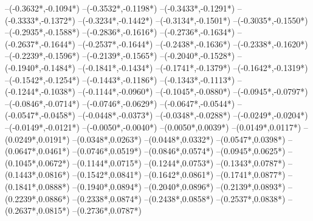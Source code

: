{	--({-0.3632*\xskala},{-0.1094*\yskala})
	--({-0.3532*\xskala},{-0.1198*\yskala})
	--({-0.3433*\xskala},{-0.1291*\yskala})
	--({-0.3333*\xskala},{-0.1372*\yskala})
	--({-0.3234*\xskala},{-0.1442*\yskala})
	--({-0.3134*\xskala},{-0.1501*\yskala})
	--({-0.3035*\xskala},{-0.1550*\yskala})
	--({-0.2935*\xskala},{-0.1588*\yskala})
	--({-0.2836*\xskala},{-0.1616*\yskala})
	--({-0.2736*\xskala},{-0.1634*\yskala})
	--({-0.2637*\xskala},{-0.1644*\yskala})
	--({-0.2537*\xskala},{-0.1644*\yskala})
	--({-0.2438*\xskala},{-0.1636*\yskala})
	--({-0.2338*\xskala},{-0.1620*\yskala})
	--({-0.2239*\xskala},{-0.1596*\yskala})
	--({-0.2139*\xskala},{-0.1565*\yskala})
	--({-0.2040*\xskala},{-0.1528*\yskala})
	--({-0.1940*\xskala},{-0.1484*\yskala})
	--({-0.1841*\xskala},{-0.1434*\yskala})
	--({-0.1741*\xskala},{-0.1379*\yskala})
	--({-0.1642*\xskala},{-0.1319*\yskala})
	--({-0.1542*\xskala},{-0.1254*\yskala})
	--({-0.1443*\xskala},{-0.1186*\yskala})
	--({-0.1343*\xskala},{-0.1113*\yskala})
	--({-0.1244*\xskala},{-0.1038*\yskala})
	--({-0.1144*\xskala},{-0.0960*\yskala})
	--({-0.1045*\xskala},{-0.0880*\yskala})
	--({-0.0945*\xskala},{-0.0797*\yskala})
	--({-0.0846*\xskala},{-0.0714*\yskala})
	--({-0.0746*\xskala},{-0.0629*\yskala})
	--({-0.0647*\xskala},{-0.0544*\yskala})
	--({-0.0547*\xskala},{-0.0458*\yskala})
	--({-0.0448*\xskala},{-0.0373*\yskala})
	--({-0.0348*\xskala},{-0.0288*\yskala})
	--({-0.0249*\xskala},{-0.0204*\yskala})
	--({-0.0149*\xskala},{-0.0121*\yskala})
	--({-0.0050*\xskala},{-0.0040*\yskala})
	--({0.0050*\xskala},{0.0039*\yskala})
	--({0.0149*\xskala},{0.0117*\yskala})
	--({0.0249*\xskala},{0.0191*\yskala})
	--({0.0348*\xskala},{0.0263*\yskala})
	--({0.0448*\xskala},{0.0332*\yskala})
	--({0.0547*\xskala},{0.0398*\yskala})
	--({0.0647*\xskala},{0.0461*\yskala})
	--({0.0746*\xskala},{0.0519*\yskala})
	--({0.0846*\xskala},{0.0574*\yskala})
	--({0.0945*\xskala},{0.0625*\yskala})
	--({0.1045*\xskala},{0.0672*\yskala})
	--({0.1144*\xskala},{0.0715*\yskala})
	--({0.1244*\xskala},{0.0753*\yskala})
	--({0.1343*\xskala},{0.0787*\yskala})
	--({0.1443*\xskala},{0.0816*\yskala})
	--({0.1542*\xskala},{0.0841*\yskala})
	--({0.1642*\xskala},{0.0861*\yskala})
	--({0.1741*\xskala},{0.0877*\yskala})
	--({0.1841*\xskala},{0.0888*\yskala})
	--({0.1940*\xskala},{0.0894*\yskala})
	--({0.2040*\xskala},{0.0896*\yskala})
	--({0.2139*\xskala},{0.0893*\yskala})
	--({0.2239*\xskala},{0.0886*\yskala})
	--({0.2338*\xskala},{0.0874*\yskala})
	--({0.2438*\xskala},{0.0858*\yskala})
	--({0.2537*\xskala},{0.0838*\yskala})
	--({0.2637*\xskala},{0.0815*\yskala})
	--({0.2736*\xskala},{0.0787*\yskala})
}
